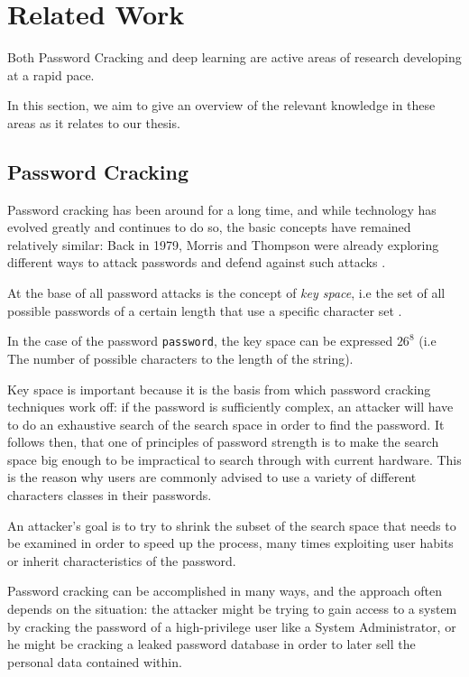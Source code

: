 \section{Related Work}
Both Password Cracking and deep learning are active areas of research developing at a rapid pace.

In this section, we aim to give an overview of the relevant knowledge in these areas as it relates to our thesis.

\subsection{Password Cracking}
Password cracking has been around for a long time, and while technology has evolved greatly and continues to do so, the basic concepts have remained relatively similar:
Back in 1979, Morris and Thompson were already exploring different ways to attack passwords and defend against such attacks \cite{Thompson1979}.

At the base of all password attacks is the concept of \emph{key space}, i.e the set of all possible passwords of a certain length that use a specific character set \cite{Thompson1979,hash_cat_mask_attack}. 

In the case of the password \texttt{password}, the key space can be expressed $26^8$ (i.e The number of possible characters to the length of the string).

Key space is important because it is the basis from which password cracking techniques work off: if the password is sufficiently complex, an attacker will have to do an exhaustive search of the search space in order to find the password. 
It follows then, that one of principles of password strength is to make the search space big enough to be impractical to search through with current hardware.
This is the reason why users are commonly advised to use a variety of different characters classes in their passwords.

An attacker's goal is to try to shrink the subset of the search space that needs to be examined in order to speed up the process, many times exploiting user habits or inherit characteristics of the password.\newline

Password cracking can be accomplished in many ways, and the approach often depends on the situation: the attacker might be trying to gain access to a system by cracking the password of a high-privilege user like a System Administrator, or he might be cracking a leaked password database in order to later sell the personal data contained within.

